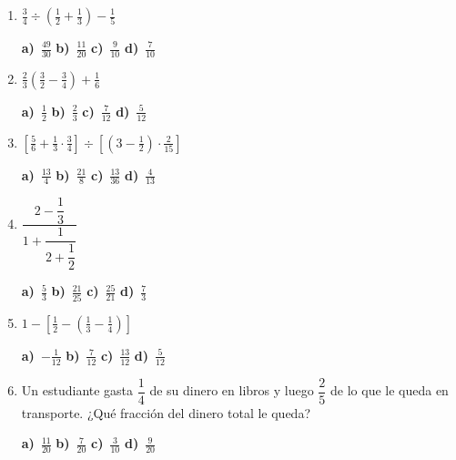 \documentclass[11pt,a4paper]{article}
\begin{document}
\begin{enumerate}[label=\textbf{\arabic*.},leftmargin=*,itemsep=14pt]
\item $\displaystyle \frac{3}{4}\div\left(\frac{1}{2}+\frac{1}{3}\right)-\frac{1}{5}$

\vspace{6pt}
\noindent \textbf{a)}~$\displaystyle \frac{49}{30}$ \hfill \textbf{b)}~$\displaystyle \frac{11}{20}$ \hfill \textbf{c)}~$\displaystyle \frac{9}{10}$ \hfill \textbf{d)}~$\displaystyle \frac{7}{10}$
\vspace{10pt}

\item $\displaystyle \frac{2}{3}\left(\frac{3}{2}-\frac{3}{4}\right)+\frac{1}{6}$

\vspace{6pt}
\noindent \textbf{a)}~$\displaystyle \frac{1}{2}$ \hfill \textbf{b)}~$\displaystyle \frac{2}{3}$ \hfill \textbf{c)}~$\displaystyle \frac{7}{12}$ \hfill \textbf{d)}~$\displaystyle \frac{5}{12}$
\vspace{10pt}

\item $\displaystyle \left[\frac{5}{6}+\frac{1}{3}\cdot\frac{3}{4}\right]\div\left[\left(3-\frac{1}{2}\right)\cdot\frac{2}{15}\right]$

\vspace{6pt}
\noindent \textbf{a)}~$\displaystyle \frac{13}{4}$ \hfill \textbf{b)}~$\displaystyle \frac{21}{8}$ \hfill \textbf{c)}~$\displaystyle \frac{13}{36}$ \hfill \textbf{d)}~$\displaystyle \frac{4}{13}$
\vspace{10pt}

\item $\displaystyle \dfrac{2-\dfrac{1}{3}}{1+\dfrac{1}{2+\dfrac{1}{2}}}$

\vspace{6pt}
\noindent \textbf{a)}~$\displaystyle \frac{5}{3}$ \hfill \textbf{b)}~$\displaystyle \frac{21}{25}$ \hfill \textbf{c)}~$\displaystyle \frac{25}{21}$ \hfill \textbf{d)}~$\displaystyle \frac{7}{3}$
\vspace{10pt}

\item $\displaystyle 1-\left[\frac{1}{2}-\left(\frac{1}{3}-\frac{1}{4}\right)\right]$

\vspace{6pt}
\noindent \textbf{a)}~$\displaystyle -\frac{1}{12}$ \hfill \textbf{b)}~$\displaystyle \frac{7}{12}$ \hfill \textbf{c)}~$\displaystyle \frac{13}{12}$ \hfill \textbf{d)}~$\displaystyle \frac{5}{12}$
\vspace{10pt}

\item Un estudiante gasta $\dfrac{1}{4}$ de su dinero en libros y luego $\dfrac{2}{5}$ de lo que le queda en transporte. ¿Qué fracción del dinero total le queda?

\vspace{6pt}
\noindent \textbf{a)}~$\displaystyle \frac{11}{20}$ \hfill \textbf{b)}~$\displaystyle \frac{7}{20}$ \hfill \textbf{c)}~$\displaystyle \frac{3}{10}$ \hfill \textbf{d)}~$\displaystyle \frac{9}{20}$
\vspace{10pt}
\end{enumerate}
\end{document}

